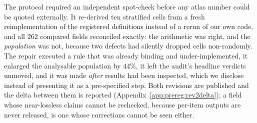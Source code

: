 The protocol required an independent spot-check before any atlas number could be
quoted externally. It re-derived ten stratified cells from a fresh
reimplementation of the registered definitions instead of a rerun of our own
code, and all 262 compared fields reconciled exactly: the arithmetic was right,
and the \emph{population} was not, because two defects had silently dropped
cells non-randomly. The repair executed a rule that was already binding and
under-implemented, it enlarged the analysable population by 44\%, it left the
audit's headline verdicts unmoved, and it was made \emph{after} results had been
inspected, which we disclose instead of presenting it as a pre-specified step.
Both revisions are published and the delta between them is reported
(Appendix~\ref{app:prereg:rev2delta}); a field whose near-lossless claims cannot
be rechecked, because per-item outputs are never released, is one whose
corrections cannot be seen either.
